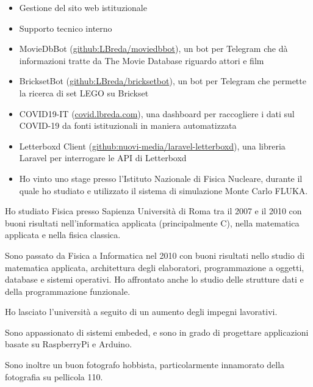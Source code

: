 \documentclass[10pt,a4paper]{altacv}
\begin{document}
\divider

\begin{itemize}
\item Gestione del sito web istituzionale
\item Supporto tecnico interno
\end{itemize}

\pagebreak

\begin{itemize}
\item MovieDbBot (\href{https://github.com/LBreda/moviedbbot}{github:LBreda/moviedbbot}), un bot per Telegram che dà informazioni tratte da The Movie Database riguardo attori e film
\item BricksetBot (\href{https://github.com/LBreda/bricksetbot}{github:LBreda/bricksetbot}), un bot per Telegram che permette la ricerca di set LEGO su Brickset 
\item COVID19-IT (\href{https://covid19.lbreda.com/}{covid.lbreda.com}), una dashboard per raccogliere i dati sul COVID-19 da fonti istituzionali in maniera automatizzata
\item Letterboxd Client (\href{https://github.com/nuovi-media/laravel-letterboxd}{github:nuovi-media/laravel-letterboxd}), una libreria Laravel per interrogare le API di Letterboxd
\end{itemize}


\begin{itemize}
\item Ho vinto uno stage presso l'Istituto Nazionale di Fisica Nucleare, durante il quale ho studiato e utilizzato il sistema di simulazione Monte Carlo FLUKA.
\end{itemize}

Ho studiato Fisica presso Sapienza Università di Roma tra il 2007 e il 2010 con buoni risultati nell'informatica applicata (principalmente C), nella matematica applicata e nella fisica classica.

\smallskip

Sono passato da Fisica a Informatica nel 2010 con buoni risultati nello studio di matematica applicata, architettura degli elaboratori, programmazione a oggetti, database e sistemi operativi. Ho affrontato anche lo studio delle strutture dati e della programmazione funzionale.

\smallskip

Ho lasciato l'università a seguito di un aumento degli impegni lavorativi.

Sono appassionato di sistemi embeded, e sono in grado di progettare applicazioni basate su RaspberryPi e Arduino.

\smallskip

Sono inoltre un buon fotografo hobbista, particolarmente innamorato della fotografia su pellicola 110.
\end{document}
